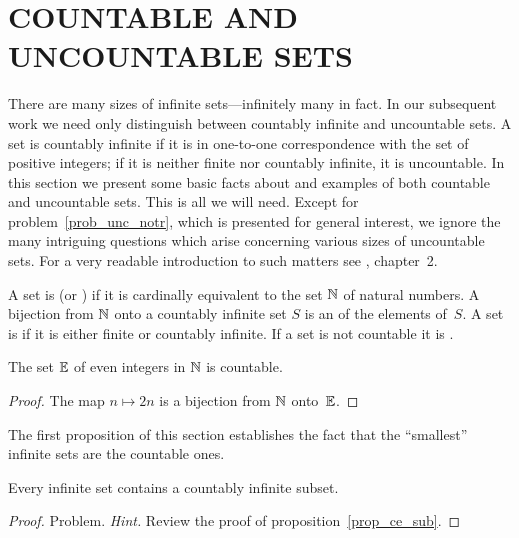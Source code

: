 \chapter{COUNTABLE AND UNCOUNTABLE SETS}


 \setcounter{section}{1}
 \setcounter{thm}{0}


There are many sizes of infinite sets---infinitely many in fact. In our subsequent work we
need only distinguish between countably infinite and uncountable sets. A set is countably
infinite if it is in one-to-one correspondence with the set of positive integers; if it is
neither finite nor countably infinite, it is uncountable. In this section we present some
basic facts about and examples of both countable and uncountable sets. This is all we will
need. Except for problem~\ref{prob_unc_notr}, which is presented for general interest, we
ignore the many intriguing questions which arise concerning various sizes of uncountable sets.
For a very readable introduction to such matters see \cite{Kaplansky:1977}, chapter~2.

\begin{defn}  A set is
 (or
%
) if it is cardinally equivalent to the set $\mathbb{N}$ of natural numbers. A
bijection from $\mathbb{N}$ onto a countably infinite set $S$ is an
 of the elements of~$S$. A set is
 if it is either finite or countably infinite.  If a
set is not countable it is
.
\end{defn}

\begin{exam} The set $\mathbb{E}$ of even integers in $\mathbb{N}$  is countable.
\end{exam}

\begin{proof}  The map $n \mapsto 2n$ is a bijection from $\mathbb{N}$ onto~$\mathbb{E}$.
\end{proof}

The first proposition of this section establishes the fact that the ``smallest'' infinite sets
are the countable ones.

\begin{prop}  Every infinite set contains a countably infinite subset.
\end{prop}


\begin{proof} Problem. \emph{Hint.}  Review the proof of proposition~\ref{prop_ce_sub}. \ns
\end{proof}

